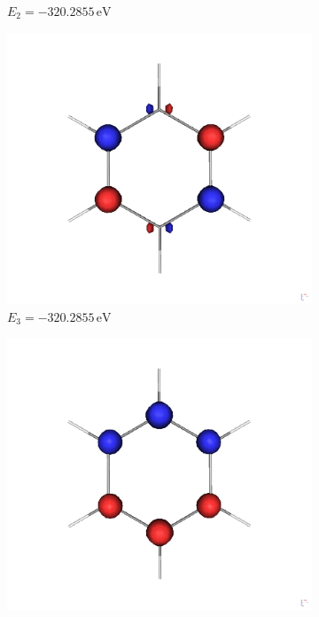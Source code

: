 \documentclass[9pt]{report}
\begin{document}
\begin{figure}[H]
\begin{subfigure}[b]{0.23\textwidth}
		\caption[Network2]{{\small $E_2=-320.2855\,\mathrm{eV}$}}
	\end{subfigure}
	\hfill
	\begin{subfigure}[b]{0.23\textwidth}
		\centering
		\includegraphics[width=\textwidth]{Benzol-3.png}
		\caption[Network2]{{\small $E_3=-320.2855\,\mathrm{eV}$}}
	\end{subfigure}
	\hfill
	\begin{subfigure}[b]{0.23\textwidth}
		\centering
		\includegraphics[width=\textwidth]{Benzol-4.png}

\end{subfigure}
\end{figure}
\end{document}
